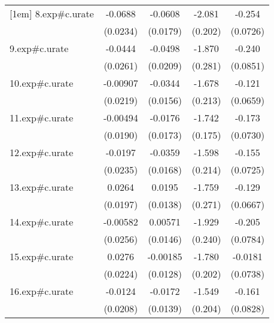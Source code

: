 {\begin{tabular}{l*{4}{c}}
[1em]
8.exp#c.urate&     -0.0688\sym{**} &     -0.0608\sym{**} &      -2.081\sym{***}&      -0.254\sym{***}\\
            &    (0.0234)         &    (0.0179)         &     (0.202)         &    (0.0726)         \\
[1em]
9.exp#c.urate&     -0.0444         &     -0.0498\sym{*}  &      -1.870\sym{***}&      -0.240\sym{**} \\
            &    (0.0261)         &    (0.0209)         &     (0.281)         &    (0.0851)         \\
[1em]
10.exp#c.urate&    -0.00907         &     -0.0344\sym{*}  &      -1.678\sym{***}&      -0.121         \\
            &    (0.0219)         &    (0.0156)         &     (0.213)         &    (0.0659)         \\
[1em]
11.exp#c.urate&    -0.00494         &     -0.0176         &      -1.742\sym{***}&      -0.173\sym{*}  \\
            &    (0.0190)         &    (0.0173)         &     (0.175)         &    (0.0730)         \\
[1em]
12.exp#c.urate&     -0.0197         &     -0.0359\sym{*}  &      -1.598\sym{***}&      -0.155\sym{*}  \\
            &    (0.0235)         &    (0.0168)         &     (0.214)         &    (0.0725)         \\
[1em]
13.exp#c.urate&      0.0264         &      0.0195         &      -1.759\sym{***}&      -0.129         \\
            &    (0.0197)         &    (0.0138)         &     (0.271)         &    (0.0667)         \\
[1em]
14.exp#c.urate&    -0.00582         &     0.00571         &      -1.929\sym{***}&      -0.205\sym{*}  \\
            &    (0.0256)         &    (0.0146)         &     (0.240)         &    (0.0784)         \\
[1em]
15.exp#c.urate&      0.0276         &    -0.00185         &      -1.780\sym{***}&     -0.0181         \\
            &    (0.0224)         &    (0.0128)         &     (0.202)         &    (0.0738)         \\
[1em]
16.exp#c.urate&     -0.0124         &     -0.0172         &      -1.549\sym{***}&      -0.161         \\
            &    (0.0208)         &    (0.0139)         &     (0.204)         &    (0.0828)         \\

\end{tabular}}
